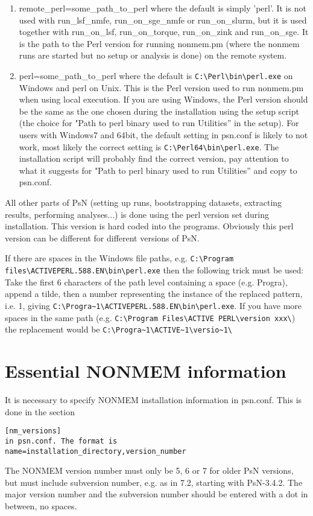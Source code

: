\begin{enumerate}
		\item remote\_perl=some\_path\_to\_perl
where the default is simply 'perl'. It is not used with run\_lsf\_nmfe, run\_on\_sge\_nmfe or run\_on\_slurm, but it is used together with run\_on\_lsf, run\_on\_torque, run\_on\_zink and run\_on\_sge. It is the path to the Perl version for running nonmem.pm (where the nonmem runs are started but no setup or analysis is done) on the remote system.

	\item perl=some\_path\_to\_perl
where the default is \verb|C:\Perl\bin\perl.exe| on Windows and perl on Unix. This is the Perl version used to run nonmem.pm when using local execution. If you are using Windows, the Perl version should be the same as the one chosen during the installation using the setup script (the choice for "Path to perl binary used to run Utilities” in the setup).
For users with Windows7 and 64bit, the default setting in psn.conf is likely to not work, most likely the correct setting is \verb|C:\Perl64\bin\perl.exe|. The installation script will probably find the correct version, pay attention to what it suggests for "Path to perl binary used to run Utilities” and copy to psn.conf. 
\end{enumerate}

All other parts of PsN (setting up runs, bootstrapping datasets, extracting results, performing analyses...) is done using the perl version set during installation. This version is hard 
coded into the programs. Obviously this perl version can be different for different versions of PsN.

If there are spaces in the Windows file paths, e.g.  \verb|C:\Program files\ACTIVEPERL.588.EN\bin\perl.exe| then the following trick must be used: Take the first 6 characters of the path level containing a space (e.g. Progra), append a tilde, then a number representing the instance of the replaced pattern, i.e. 1, giving \verb|C:\Progra~1\ACTIVEPERL.588.EN\bin\perl.exe|. If you have more spaces in the same path (e.g. \verb|C:\Program Files\ACTIVE PERL\version xxx\|) the replacement would be \verb|C:\Progra~1\ACTIVE~1\versio~1\|

\section{Essential NONMEM information}
It is necessary to specify NONMEM installation information in psn.conf. This is done in the section
\begin{verbatim}
[nm_versions]
in psn.conf. The format is 
name=installation_directory,version_number
\end{verbatim}
The NONMEM version number must only be 5, 6 or 7 for older PsN versions, but must include subversion number, e.g. as in 7.2, starting with PsN-3.4.2. The major version number and the subversion number should be entered with a dot in between, no spaces.  

